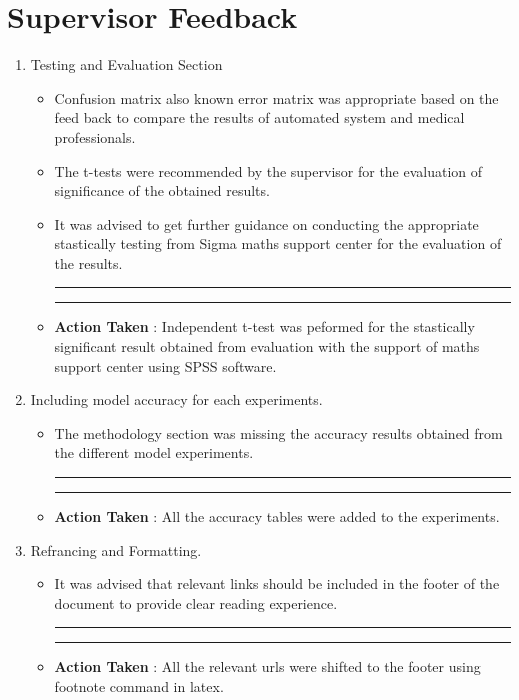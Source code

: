 
\section{Supervisor Feedback}
\begin{enumerate}
    \item Testing and Evaluation Section
    \begin{itemize}
        \item Confusion matrix also known error matrix was appropriate based on the feed back to compare the 
        results of automated system and medical professionals.
        \item The t-tests were recommended by the supervisor for the evaluation of significance of the 
        obtained results.
        \item It was advised to get further guidance on conducting the appropriate stastically testing from Sigma maths 
        support center for the evaluation of the results.
        \vspace{2mm}
        \hrule
        \hrule
        \item \textbf{Action Taken} : Independent t-test was peformed for the stastically significant result obtained 
        from evaluation with the support of maths support center using SPSS software.
    \end{itemize}

    \item Including model accuracy for each experiments.
    \begin{itemize}
        \item The methodology section was missing the accuracy results obtained from the different model experiments.
        \vspace{2mm}
        \hrule
        \hrule
        \item \textbf{Action Taken} : All the accuracy tables were added to the experiments.
    \end{itemize}

    \item Refrancing and Formatting.
        \begin{itemize}
        \item It was advised that relevant links should be included in the footer of the document to 
        provide clear reading experience.
        \vspace{2mm}
        \hrule
        \hrule
        \item \textbf{Action Taken} : All the relevant urls were shifted to the footer using footnote command in latex.
    \end{itemize}
\end{enumerate}
\pagebreak

